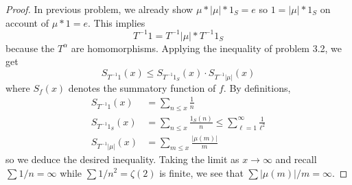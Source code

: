 \documentclass{article}
\begin{document}
\begin{proof}
In previous problem, we already show $\mu * |\mu| * 1_S = e$ so $1 = |\mu| * 1_S$ on account of $\mu * 1 = e$. This implies
$$T^{-1} 1 = T^{-1} |\mu| * T^{-1} 1_S$$
because the $T^{\alpha}$ are homomorphisms. Applying the inequality of problem 3.2, we get
$$S_{T^{-1} 1}(x) \leq S_{T^{-1} 1_S}(x) \cdot S_{T^{-1} |\mu|}(x)$$
where $S_f(x)$ denotes the summatory function of $f$. By definitions,
\begin{align*}
S_{T^{-1} 1}(x) &= \sum_{n \leq x} \frac{1}{n}\\
S_{T^{-1} 1_S}(x) &= \sum_{n \leq x} \frac{1_S(n)}{n} \leq \sum_{\ell = 1}^{\infty} \frac{1}{\ell^2}\\
S_{T^{-1} |\mu|}(x) &= \sum_{m \leq x} \frac{|\mu(m)|}{m}
\end{align*}
so we deduce the desired inequality. Taking the limit as $x \rightarrow \infty$ and recall $\sum 1/n = \infty$ while $\sum 1/n^2 = \zeta(2)$ is finite, we see that $\sum |\mu(m)|/m = \infty$.
\end{proof}

\unless\ifdefined\IsMainDocument
\end{document}
